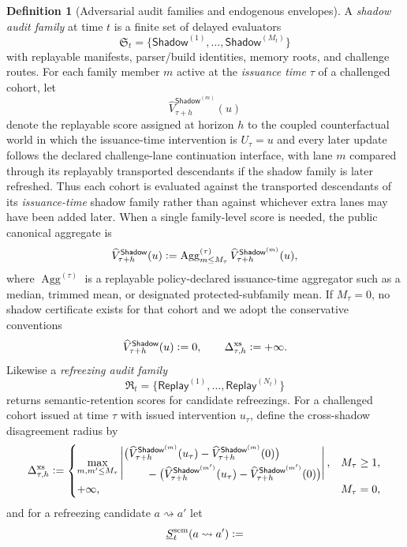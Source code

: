 \documentclass[11pt]{article}
\theoremstyle{definition}
\newtheorem{definition}[theorem]{Definition}
\newcommand{\1}{\mathbf{1}}
\newcommand{\Defeq}{\vcentcolon=}
\newcommand{\Shadow}{\mathsf{Shadow}}
\newcommand{\Replay}{\mathsf{Replay}}
\begin{document}
\begin{definition}[Adversarial audit families and endogenous envelopes]\label{def:audit_family}
A \emph{shadow audit family} at time $t$ is a finite set of delayed evaluators
\[
\mathfrak S_t=\{\Shadow^{(1)},\dots,\Shadow^{(M_t)}\}
\]
with replayable manifests, parser/build identities, memory roots, and challenge routes. For each family member $m$ active at the \emph{issuance time} $\tau$ of a challenged cohort, let
\[
\widehat V_{\tau+h}^{\Shadow^{(m)}}(u)
\]
denote the replayable score assigned at horizon $h$ to the coupled counterfactual world in which the issuance-time intervention is $U_\tau=u$ and every later update follows the declared challenge-lane continuation interface, with lane $m$ compared through its replayably transported descendants if the shadow family is later refreshed. Thus each cohort is evaluated against the transported descendants of its \emph{issuance-time} shadow family rather than against whichever extra lanes may have been added later. When a single family-level score is needed, the public canonical aggregate is
\[
\widehat V_{\tau+h}^{\Shadow}(u)\Defeq \operatorname{Agg}^{(\tau)}_{m\le M_\tau}\widehat V_{\tau+h}^{\Shadow^{(m)}}(u),
\]
where $\operatorname{Agg}^{(\tau)}$ is a replayable policy-declared issuance-time aggregator such as a median, trimmed mean, or designated protected-subfamily mean. If $M_\tau=0$, no shadow certificate exists for that cohort and we adopt the conservative conventions
\[
\widehat V_{\tau+h}^{\Shadow}(u)\Defeq 0,
\qquad
\Delta_{\tau,h}^{\mathrm{xs}}\Defeq +\infty.
\]
Likewise a \emph{refreezing audit family}
\[
\mathfrak R_t=\{\Replay^{(1)},\dots,\Replay^{(N_t)}\}
\]
returns semantic-retention scores for candidate refreezings. For a challenged cohort issued at time $\tau$ with issued intervention $u_\tau$, define the cross-shadow disagreement radius by
\[
\Delta_{\tau,h}^{\mathrm{xs}}\Defeq
\begin{cases}
\max\limits_{m,m'\le M_\tau}
\left|
\begin{aligned}
&\bigl(\widehat V_{\tau+h}^{\Shadow^{(m)}}(u_\tau)-\widehat V_{\tau+h}^{\Shadow^{(m)}}(0)\bigr)\\
&\qquad-\bigl(\widehat V_{\tau+h}^{\Shadow^{(m')}}(u_\tau)-\widehat V_{\tau+h}^{\Shadow^{(m')}}(0)\bigr)
\end{aligned}
\right|, & M_\tau\ge 1,\\[1.0ex]
+\infty, & M_\tau=0,
\end{cases}
\]
and for a refreezing candidate $a\rightsquigarrow a'$ let
\[
\underline S_t^{\mathrm{sem}}(a\rightsquigarrow a')\Defeq
\]
\end{definition}
\end{document}

